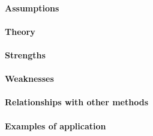 \paragraph{Assumptions}
\paragraph{Theory}
\paragraph{Strengths}
\paragraph{Weaknesses}
\paragraph{Relationships with other methods}
\paragraph{Examples of application}

